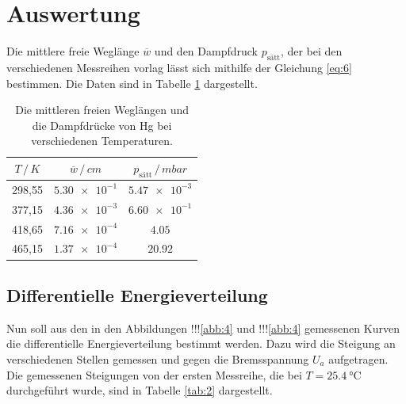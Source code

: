 \section{Auswertung}

Die mittlere freie Weglänge $\overline{w}$ und den Dampfdruck $p_\text{sätt}$, der bei den verschiedenen
Messreihen vorlag lässt sich mithilfe der Gleichung \ref{eq:6} bestimmen. Die Daten
sind in Tabelle \ref{tab:1} dargestellt.

\begin{table}
  \centering
  \caption{Die mittleren freien Weglängen und die Dampfdrücke von Hg bei verschiedenen
  Temperaturen.}
  \label{tab:1}
  \begin{tabular}{c c c}
    \toprule
    $T \, / \, K$ & $\overline{w} \, / \, cm$ & $p_\text{sätt} \, / \, mbar$ \\
    \midrule
    298,55 & $\num{5.30e-1}$ & $\num{5.47e-3}$ \\
    377,15 & $\num{4.36e-3}$ & $\num{6.60e-1}$ \\
    418,65 & $\num{7.16e-4}$ & $\num{4.05}$    \\
    465,15 & $\num{1.37e-4}$ & $\num{20.92}$ \\
    \bottomrule
  \end{tabular}
\end{table}

\subsection{Differentielle Energieverteilung}

Nun soll aus den in den Abbildungen !!!\ref{abb:4} und !!!\ref{abb:4} gemessenen Kurven
die differentielle Energieverteilung bestimmt werden. Dazu wird die Steigung
an verschiedenen Stellen gemessen und gegen die Bremsspannung $U_a$ aufgetragen.
Die gemessenen Steigungen von der ersten Messreihe, die bei $T = \SI{25.4}{\celsius}$
durchgeführt wurde, sind in Tabelle \ref{tab:2} dargestellt.


